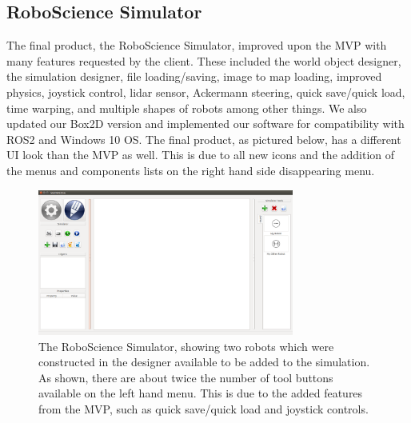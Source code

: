 \subsection{RoboScience Simulator}

The final product, the RoboScience Simulator, improved upon the MVP with many features requested by the client. These included the world object designer, the simulation designer, file loading/saving, image to map loading, improved physics, joystick control, lidar sensor, Ackermann steering, quick save/quick load, time warping, and multiple shapes of robots among other things. We also updated our Box2D version and implemented our software for compatibility with ROS2 and Windows 10 OS. The final product, as pictured below, has a different UI look than the MVP as well. This is due to all new icons and the addition of the menus and components lists on the right hand side disappearing menu. 

\begin{figure}[!htb]
	\begin{center}
		\includegraphics[width=0.75\textwidth]{./Images/simulator_with_my_robots}
	\end{center}
	\caption{The RoboScience Simulator, showing two robots which were constructed in the designer available to be added to the simulation. As shown, there are about twice the number of tool buttons available on the left hand menu. This is due to the added features from the MVP, such as quick save/quick load and joystick controls. \label{mvp2}}
\end{figure}

